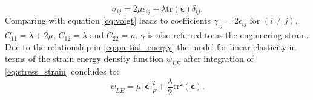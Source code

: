 \documentclass[m,times]{cgMA}
\begin{document}
\begin{equation} \label{eq:stress_strain}
  \sigma_{ij} = 2\mu \epsilon_{ij} + \lambda \text{tr}(\boldsymbol{\epsilon}) \delta_{ij}.
\end{equation}
Comparing with equation \ref{eq:voigt} leads to coefficients $\gamma_{ij} = 2\epsilon_{ij} \text{ for } (i \neq j)$, $C_{11} = \lambda +2 \mu$, $C_{12} = \lambda$ and $C_{22} = \mu$. $\gamma$ is also referred to as the engineering strain. Due to the relationship in \ref{eq:partial_energy} the model for linear elasticity in terms of the strain energy density function $\psi_{LE}$ after integration of \ref{eq:stress_strain} concludes to:
\begin{equation}\label{eq:linear_elas}
  \psi_{LE} = \mu \Vert \boldsymbol{\epsilon} \Vert^2_F + \frac{\lambda}{2} \text{tr}^2(\boldsymbol{\epsilon}).
\end{equation}
\cite{MIT:LINEAR_ELASTICITY}
\end{document}
